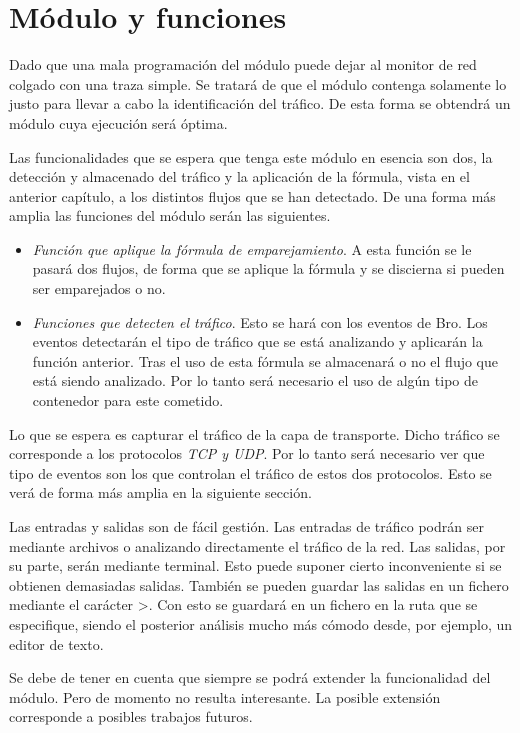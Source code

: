 \section{Módulo y funciones}

Dado que una mala programación del módulo puede dejar al monitor de red colgado con una traza simple. Se tratará de 
que el módulo contenga solamente lo justo para llevar a cabo la identificación del tráfico. De esta forma se 
obtendrá un módulo cuya ejecución será óptima. 

\intro Las funcionalidades que se espera que tenga este módulo en esencia son dos, la detección y almacenado 
del tráfico y la aplicación de la fórmula, vista en el anterior capítulo, a los distintos flujos que se han 
detectado. De una forma más amplia las funciones del módulo serán las siguientes. 

\begin{itemize}
\item \textit{Función que aplique la fórmula de emparejamiento}. 
\intro A esta función se le pasará dos flujos, de forma que se aplique la fórmula y se discierna si pueden 
ser emparejados o no.
\item \textit{Funciones que detecten el tráfico}. 
\intro Esto se hará con los eventos de Bro. Los eventos detectarán el tipo de tráfico que se está analizando 
y aplicarán la función anterior.
\intro Tras el uso de esta fórmula se almacenará o no el flujo que está siendo analizado. Por lo tanto 
será necesario el uso de algún tipo de contenedor para este cometido.
\end{itemize}

\intro Lo que se espera es capturar el tráfico de la capa de transporte. Dicho tráfico se corresponde a los 
protocolos \textit{TCP y UDP}. Por lo tanto será necesario ver que tipo de eventos son los que controlan el tráfico 
de estos dos protocolos. Esto se verá de forma más amplia en la siguiente sección.

\intro Las entradas y salidas son de fácil gestión. Las entradas de tráfico podrán ser mediante archivos o 
analizando directamente el tráfico de la red. Las salidas, por su parte, serán mediante terminal. Esto puede 
suponer cierto inconveniente si se obtienen demasiadas salidas. También se pueden guardar las salidas en un 
fichero mediante el carácter >. Con esto se guardará en un fichero en la ruta que se especifique, siendo el 
posterior análisis mucho más cómodo desde, por ejemplo, un editor de texto.

\intro Se debe de tener en cuenta que siempre se podrá extender la funcionalidad del módulo. Pero de momento no 
resulta interesante. La posible extensión corresponde a posibles trabajos futuros.

